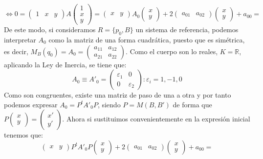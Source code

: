 \documentclass[10pt,a4paper,openright]{book}
\theoremstyle{break}
\begin{document}
$$\Leftrightarrow 0 = \begin{pmatrix}
1 & x & y
\end{pmatrix} A \begin{pmatrix}
1 \\ x \\ y
\end{pmatrix} = \begin{pmatrix}
x & y
\end{pmatrix} A_0 \begin{pmatrix}
x \\ y
\end{pmatrix} + 2 \begin{pmatrix}
a_{01} & a_{02} \end{pmatrix} \begin{pmatrix}
x \\ y
\end{pmatrix} + a_{00} =
$$
De este modo, si consideramos $R = \{p_0, B\}$ un sistema de referencia, podemos interpretar $A_0$ como la matriz de una forma cuadrática, puesto que es simétrica, es decir, $M_B (q_0) = A_0 = \begin{pmatrix}
a_{11} & a_{12} \\ a_{21} & a_{22}
\end{pmatrix}
$. Como el cuerpo son lo reales, $K = \mathbb{R}$, aplicando la Ley de Inercia, se tiene que:
$$A_0 \equiv A'_0 = \begin{pmatrix}
\varepsilon_1 & 0 \\ 0 & \varepsilon_2
\end{pmatrix}: \varepsilon_i = 1, - 1, 0$$
Como son congruentes, existe una matriz de paso de una a otra y por tanto podemos expresar $A_0 = P^t  A'_0 P $, siendo $P = M(B, B')$ de forma que $P \begin{pmatrix}
x \\ y
\end{pmatrix} = \begin{pmatrix}
x' \\ y'
\end{pmatrix}$. Ahora si sustituimos convenientemente en la expresión inicial tenemos que:
$$\begin{pmatrix}
x & y
\end{pmatrix}P^t  A'_0 P \begin{pmatrix}
x \\ y
\end{pmatrix} + 2 \begin{pmatrix}
a_{01} & a_{02} \end{pmatrix} \begin{pmatrix}
x \\ y
\end{pmatrix} + a_{00} = $$
\end{document}
